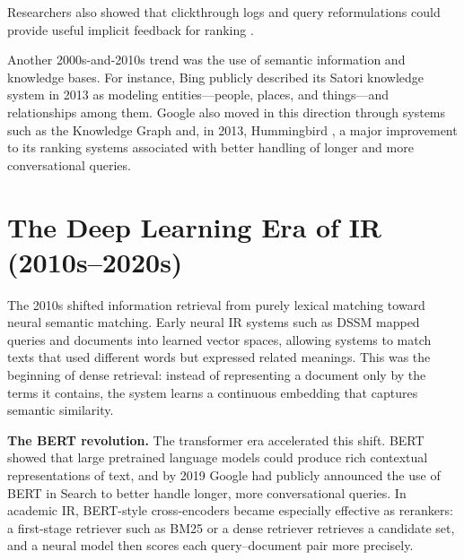 Researchers also showed that clickthrough logs and query reformulations could provide useful implicit feedback for ranking .

Another 2000s-and-2010s trend was the use of semantic information and knowledge bases. For instance, Bing publicly described its Satori knowledge system  in 2013 as modeling entities---people, places, and things---and relationships among them. Google also moved in this direction through systems such as the Knowledge Graph and, in 2013, Hummingbird , a major improvement to its ranking systems associated with better handling of longer and more conversational queries.

\section{The Deep Learning Era of IR (2010s--2020s)}

The 2010s shifted information retrieval from purely lexical matching toward neural semantic matching. Early neural IR systems such as DSSM  mapped queries and documents into learned vector spaces, allowing systems to match texts that used different words but expressed related meanings. This was the beginning of dense retrieval: instead of representing a document only by the terms it contains, the system learns a continuous embedding that captures semantic similarity.

\noindent\textbf{The BERT revolution.} The transformer era accelerated this shift. BERT  showed that large pretrained language models could produce rich contextual representations of text, and by 2019 Google had publicly announced the use of BERT in Search  to better handle longer, more conversational queries. In academic IR, BERT-style cross-encoders  became especially effective as rerankers: a first-stage retriever such as BM25 or a dense retriever retrieves a candidate set, and a neural model then scores each query--document pair more precisely.

